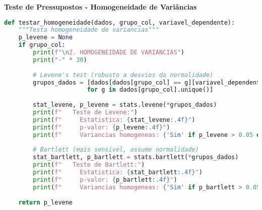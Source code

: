\begin{examplebox}
\textbf{Teste de Pressupostos - Homogeneidade de Variâncias}

\begin{lstlisting}[language=Python]
def testar_homogeneidade(dados, grupo_col, variavel_dependente):
    """Testa homogeneidade de variancias"""
    p_levene = None
    if grupo_col:
        print(f"\n2. HOMOGENEIDADE DE VARIANCIAS")
        print("-" * 30)
        
        # Levene's test (robusto a desvios da normalidade)
        grupos_dados = [dados[dados[grupo_col] == g][variavel_dependente] 
                       for g in dados[grupo_col].unique()]
        
        stat_levene, p_levene = stats.levene(*grupos_dados)
        print(f"   Teste de Levene:")
        print(f"     Estatistica: {stat_levene:.4f}")
        print(f"     p-valor: {p_levene:.4f}")
        print(f"     Variancias homogeneas: {'Sim' if p_levene > 0.05 else 'Nao'}")
        
        # Bartlett (mais sensivel, assume normalidade)
        stat_bartlett, p_bartlett = stats.bartlett(*grupos_dados)
        print(f"   Teste de Bartlett:")
        print(f"     Estatistica: {stat_bartlett:.4f}")
        print(f"     p-valor: {p_bartlett:.4f}")
        print(f"     Variancias homogeneas: {'Sim' if p_bartlett > 0.05 else 'Nao'}")
    
    return p_levene
\end{lstlisting}
\end{examplebox}

